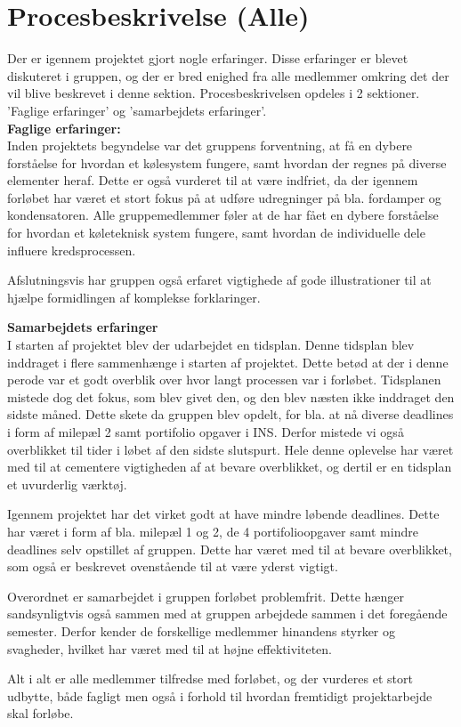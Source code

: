 \documentclass[../Hovedrapport.tex]{subfiles}
\begin{document}
\section{Procesbeskrivelse (Alle)}
    \label{sec:batman}
Der er igennem projektet gjort nogle erfaringer. Disse erfaringer er blevet diskuteret i gruppen, og der er bred enighed fra alle medlemmer omkring det der vil blive beskrevet i denne sektion. Procesbeskrivelsen opdeles i 2 sektioner. 'Faglige erfaringer' og 'samarbejdets erfaringer'. \\ 
\textbf{Faglige erfaringer:} \\
Inden projektets begyndelse var det gruppens forventning, at få en dybere forståelse for hvordan et kølesystem fungere, samt hvordan der regnes på diverse elementer heraf. Dette er også vurderet til at være indfriet, da der igennem forløbet har været et stort fokus på at udføre udregninger på bla. fordamper og kondensatoren.   
Alle gruppemedlemmer føler at de har fået en dybere forståelse for hvordan et køleteknisk system fungere, samt hvordan de individuelle dele influere kredsprocessen. 

Afslutningsvis har gruppen også erfaret vigtighede af gode illustrationer til at hjælpe formidlingen af komplekse forklaringer. 

\textbf{Samarbejdets erfaringer} \\
I starten af projektet blev der udarbejdet en tidsplan. Denne tidsplan blev inddraget i flere sammenhænge i starten af projektet. Dette betød at der i denne perode var et godt overblik over hvor langt processen var i forløbet. Tidsplanen mistede dog det fokus, som blev givet den, og den blev næsten ikke inddraget den sidste måned. Dette skete da gruppen blev opdelt, for bla. at nå diverse deadlines i form af milepæl 2 samt portifolio opgaver i INS. Derfor mistede vi også overblikket til tider i løbet af den sidste slutspurt. 
Hele denne oplevelse har været med til at cementere vigtigheden af at bevare overblikket, og dertil er en tidsplan et uvurderlig værktøj.

Igennem projektet har det virket godt at have mindre løbende deadlines. Dette har været i form af bla. milepæl 1 og 2, de 4 portifolioopgaver samt mindre deadlines selv opstillet af gruppen. Dette har været med til at bevare overblikket, som også er beskrevet ovenstående til at være yderst vigtigt. 

Overordnet er samarbejdet i gruppen forløbet problemfrit. Dette hænger sandsynligtvis også sammen med at gruppen arbejdede sammen i det foregående semester. Derfor kender de forskellige medlemmer hinandens styrker og svagheder, hvilket har været med til at højne effektiviteten.

Alt i alt er alle medlemmer tilfredse med forløbet, og der vurderes et stort udbytte, både fagligt men også i forhold til hvordan fremtidigt projektarbejde skal forløbe. 
\end{document}
